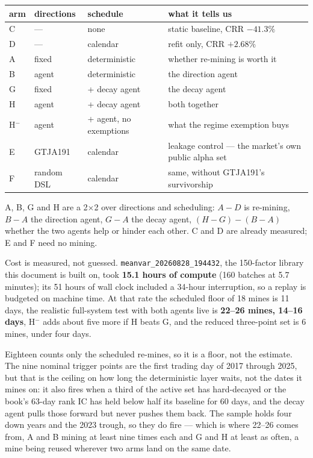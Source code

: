 \documentclass[11pt]{article}
\begin{document}
\begin{table}[h]
\centering
\small
\begin{tabular}{lllp{6.2cm}}
\toprule
arm & directions & schedule & what it tells us \\
\midrule
C & --- & none & static baseline, CRR $-41.3\%$ \\
D & --- & calendar & refit only, CRR $+2.68\%$ \\
A & fixed & deterministic & whether re-mining is worth it \\
B & agent & deterministic & the direction agent \\
G & fixed & + decay agent & the decay agent \\
H & agent & + decay agent & both together \\
H$^-$ & agent & + agent, no exemptions & what the regime exemption buys \\
E & GTJA191 & calendar & leakage control --- the market's own public alpha set \\
F & random DSL & calendar & same, without GTJA191's survivorship \\
\bottomrule
\end{tabular}
\end{table}

A, B, G and H are a 2$\times$2 over directions and scheduling: $A-D$ is re-mining,
$B-A$ the direction agent, $G-A$ the decay agent, $(H-G)-(B-A)$ whether the two agents
help or hinder each other. C and D are already measured; E and F need no mining.

Cost is measured, not guessed. \texttt{meanvar\_20260828\_194432}, the 150-factor library
this document is built on, took \textbf{15.1 hours of compute} (160 batches at 5.7
minutes); its 51 hours of wall clock included a 34-hour interruption, so a replay is
budgeted on machine time. At that rate the scheduled floor of 18 mines is 11 days, the
realistic full-system test with both agents live is \textbf{22--26 mines, 14--16 days},
H$^-$ adds about five more if H beats G, and the reduced three-point set is 6 mines,
under four days.

Eighteen counts only the scheduled re-mines, so it is a floor, not the estimate. The nine
nominal trigger points are the first trading day of 2017 through 2025, but that is the
ceiling on how long the deterministic layer waits, not the dates it mines on: it also
fires when a third of the active set has hard-decayed or the book's 63-day rank IC has
held below half its baseline for 60 days, and the decay agent pulls those forward but
never pushes them back. The sample holds four down years and the 2023 trough, so they do
fire --- which is where 22--26 comes from, A and B mining at least nine times each and G
and H at least as often, a mine being reused wherever two arms land on the same date.
\end{document}

